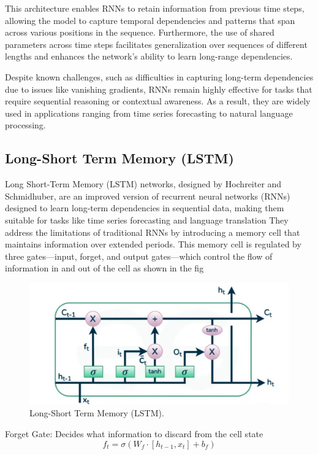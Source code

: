 This architecture enables RNNs to retain information from previous time steps, allowing the model to capture temporal dependencies and patterns that span across various positions in the sequence. Furthermore, the use of shared parameters across time steps facilitates generalization over sequences of different lengths and enhances the network's ability to learn long-range dependencies.

Despite known challenges, such as difficulties in capturing long-term dependencies due to issues like vanishing gradients, RNNs remain highly effective for tasks that require sequential reasoning or contextual awareness. As a result, they are widely used in applications ranging from time series forecasting to natural language processing.
\cite{cho2014learning} 

\subsection{ Long-Short Term Memory (LSTM)}
Long Short-Term Memory (LSTM) networks, designed by Hochreiter and Schmidhuber, are an improved version of recurrent neural networks (RNNs) designed to learn long-term dependencies in sequential data, making them suitable for tasks like time series forecasting and language translation
They address the limitations of traditional RNNs by introducing a memory cell that maintains information over extended periods. This memory cell is regulated by three gates—input, forget, and output gates—which control the flow of information in and out of the cell as shown in the fig \cite{geeksforgeeks_lstm}
\begin{figure}[htbp]
	\centering\includegraphics[width=0.9\linewidth]{Figures/LSTM.png}
	\caption{Long-Short Term Memory (LSTM).}
	\label{/LSTM.png}
\end{figure}


Forget Gate: Decides what information to discard from the cell state
\begin{equation}
	f_t = \sigma \left( W_f \cdot [h_{t-1}, x_t] + b_f \right)
\end{equation}

